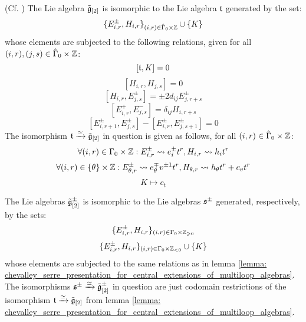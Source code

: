             \begin{lemma} \label{lemma: chevalley_serre_presentation_for_central_extensions_of_multiloop_algebras}
                (Cf. \cite[Proposition 6.6]{wendlandt_formal_shift_operators_on_yangian_doubles}) The Lie algebra $\tilde{\mathfrak{g}}_{[2]}$ is isomorphic to the Lie algebra $\mathfrak{t}$ generated by the set:
                    $$\{ E_{i, r}^{\pm}, H_{i, r} \}_{(i, r) \in \hat{\Gamma}_0 \x \Z} \cup \{ K \}$$
                whose elements are subjected to the following relations, given for all $(i, r), (j, s) \in \hat{\Gamma}_0 \x \Z$:
                    $$[\mathfrak{t}, K] = 0$$
                    $$[ H_{i, r}, H_{j, s} ] = 0$$
                    $$[ H_{i, r}, E_{j, s}^{\pm} ] = \pm 2 d_{ij} E_{j, r + s}^{\pm}$$
                    $$[ E_{i, r}^+, E_{j, s}^- ] = \delta_{ij} H_{i, r + s}$$
                    $$[ E_{i, r + 1}^{\pm}, E_{j, s}^{\pm} ] - [ E_{i, r}^{\pm}, E_{j, s + 1}^{\pm} ] = 0$$
                The isomorphism $\mathfrak{t} \xrightarrow[]{\simeq} \tilde{\mathfrak{g}}_{[2]}$ in question is given as follows, for all $(i, r) \in \hat{\Gamma}_0 \x \Z$:
                    $$\forall (i, r) \in \Gamma_0 \x \Z: E_{i, r}^{\pm} \mapsto e_i^{\pm} t^r, H_{i, r} \mapsto h_i t^r$$
                    $$\forall (i, r) \in \{\theta\} \x \Z: E_{\theta, r}^{\pm} \mapsto e_{\theta}^{\mp} v^{\pm 1} t^r, H_{\theta, r} \mapsto h_{\theta} t^r + c_v t^r$$
                    $$K \mapsto c_t$$
            \end{lemma}
            \begin{corollary} \label{coro: chevalley_serre_presentation_for_central_extensions_of_multiloop_algebras}
                The Lie algebras $\tilde{\mathfrak{g}}_{[2]}^{\pm}$ is isomorphic to the Lie algebras $\mathfrak{s}^{\pm}$ generated, respectively, by the sets:
                    $$\{ E_{i, r}^{\pm}, H_{i, r} \}_{(i, r) \in \Gamma_0 \x \Z_{\geq 0}}$$
                    $$\{ E_{i, r}^{\pm}, H_{i, r} \}_{(i, r) \in \Gamma_0 \x \Z_{< 0}} \cup \{K\}$$
                whose elements are subjected to the same relations as in lemma \ref{lemma: chevalley_serre_presentation_for_central_extensions_of_multiloop_algebras}. The isomorphisms $\mathfrak{s}^{\pm} \xrightarrow[]{\simeq} \tilde{\mathfrak{g}}_{[2]}^{\pm}$ in question are just codomain restrictions of the isomorphism $\mathfrak{t} \xrightarrow[]{\simeq} \tilde{\mathfrak{g}}_{[2]}$ from lemma \ref{lemma: chevalley_serre_presentation_for_central_extensions_of_multiloop_algebras}.
            \end{corollary}
            
